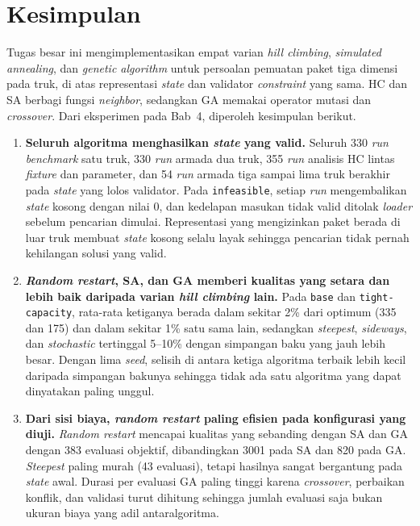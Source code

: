 \section{Kesimpulan}

Tugas besar ini mengimplementasikan empat varian \textit{hill climbing}, \textit{simulated annealing}, dan \textit{genetic algorithm} untuk persoalan pemuatan paket tiga dimensi pada truk, di atas representasi \textit{state} dan validator \textit{constraint} yang sama. HC dan SA berbagi fungsi \textit{neighbor}, sedangkan GA memakai operator mutasi dan \textit{crossover}. Dari eksperimen pada Bab~4, diperoleh kesimpulan berikut.

\begin{enumerate}
    \item \textbf{Seluruh algoritma menghasilkan \textit{state} yang valid.} Seluruh 330 \textit{run} \textit{benchmark} satu truk, 330 \textit{run} armada dua truk, 355 \textit{run} analisis HC lintas \textit{fixture} dan parameter, dan 54 \textit{run} armada tiga sampai lima truk berakhir pada \textit{state} yang lolos validator. Pada \texttt{infeasible}, setiap \textit{run} mengembalikan \textit{state} kosong dengan nilai 0, dan kedelapan masukan tidak valid ditolak \textit{loader} sebelum pencarian dimulai. Representasi yang mengizinkan paket berada di luar truk membuat \textit{state} kosong selalu layak sehingga pencarian tidak pernah kehilangan solusi yang valid.

    \item \textbf{\textit{Random restart}, SA, dan GA memberi kualitas yang setara dan lebih baik daripada varian \textit{hill climbing} lain.} Pada \texttt{base} dan \texttt{tight-capacity}, rata-rata ketiganya berada dalam sekitar 2\% dari optimum (335 dan 175) dan dalam sekitar 1\% satu sama lain, sedangkan \textit{steepest}, \textit{sideways}, dan \textit{stochastic} tertinggal 5--10\% dengan simpangan baku yang jauh lebih besar. Dengan lima \textit{seed}, selisih di antara ketiga algoritma terbaik lebih kecil daripada simpangan bakunya sehingga tidak ada satu algoritma yang dapat dinyatakan paling unggul.

    \item \textbf{Dari sisi biaya, \textit{random restart} paling efisien pada konfigurasi yang diuji.} \textit{Random restart} mencapai kualitas yang sebanding dengan SA dan GA dengan 383 evaluasi objektif, dibandingkan 3001 pada SA dan 820 pada GA. \textit{Steepest} paling murah (43 evaluasi), tetapi hasilnya sangat bergantung pada \textit{state} awal. Durasi per evaluasi GA paling tinggi karena \textit{crossover}, perbaikan konflik, dan validasi turut dihitung sehingga jumlah evaluasi saja bukan ukuran biaya yang adil antaralgoritma.


\end{enumerate}
